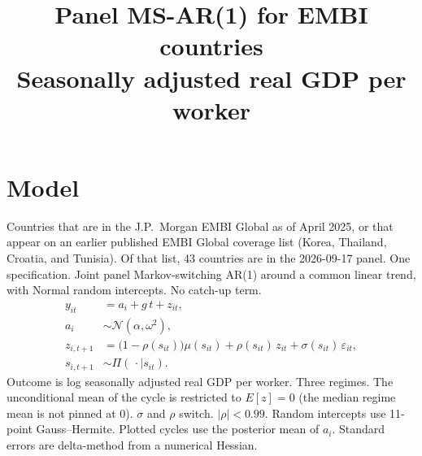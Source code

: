 \documentclass[11pt]{article}
\title{Panel MS-AR(1) for EMBI countries\\[0.4em]\large Seasonally adjusted real GDP per worker}
\author{}
\date{}
\begin{document}
\maketitle
\section{Model}
Countries that are in the J.P.\ Morgan EMBI Global as of April 2025, or that appear on an earlier published EMBI Global coverage list (Korea, Thailand, Croatia, and Tunisia). Of that list, 43 countries are in the 2026-09-17 panel.
One specification. Joint panel Markov-switching AR(1) around a common linear trend, with Normal random intercepts. No catch-up term.
\begin{align}
y_{it} &= a_i + g\, t + z_{it}, \\
a_i &\sim \mathcal{N}(\alpha,\omega^2), \\
z_{i,t+1} &= \bigl(1-\rho(s_{it})\bigr)\mu(s_{it}) + \rho(s_{it})\, z_{it} + \sigma(s_{it})\,\varepsilon_{it}, \\
s_{i,t+1} &\sim \Pi(\,\cdot\mid s_{it}).
\end{align}
Outcome is log seasonally adjusted real GDP per worker. Three regimes. The unconditional mean of the cycle is restricted to $E[z]=0$ (the median regime mean is not pinned at 0). $\sigma$ and $\rho$ switch. $|\rho|<0.99$. Random intercepts use 11-point Gauss--Hermite. Plotted cycles use the posterior mean of $a_i$. Standard errors are delta-method from a numerical Hessian.
\clearpage
\end{document}

